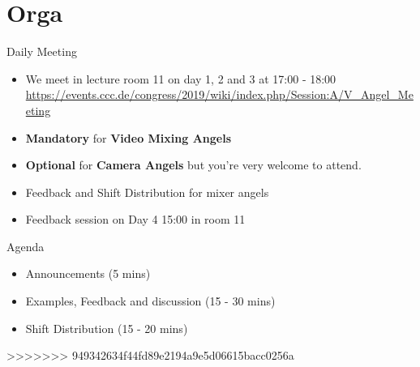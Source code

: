 \documentclass[aspectratio=169]{beamer}
\begin{document}
\section{Orga} 				%
\begin{frame}{Daily Meeting}
\begin{itemize}
	\item We meet in lecture room 11 on day 1, 2 and 3 at 17:00 - 18:00 \\
	\renewcommand\UrlFont{\color{blue}\sffamily\textbf}
	\url{https://events.ccc.de/congress/2019/wiki/index.php/Session:A/V_Angel_Meeting}
	\item  \textbf{Mandatory} for \textbf{Video Mixing Angels}
	\item  \textbf{Optional} for \textbf{Camera Angels} but you're very welcome to attend.
	\item  Feedback and Shift Distribution for mixer angels
	\item Feedback session on Day 4 15:00 in room 11
\end{itemize} 
\end{frame}


\begin{frame}{Agenda}		%
\begin{itemize}
	\item Announcements (5 mins)
	\item Examples, Feedback and discussion (15 - 30 mins)
	\item Shift Distribution (15 - 20 mins)
\end{itemize} 
\end{frame}
>>>>>>> 949342634f44fd89e2194a9e5d06615bacc0256a
\end{document}
